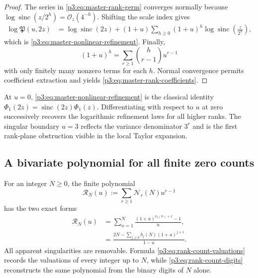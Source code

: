 \documentclass[11pt,oneside]{article}
\theoremstyle{definition}
\theoremstyle{remark}
\newcommand{\sinc}{\operatorname{sinc}}
\newcommand{\bigO}{\mathcal O}
\begin{document}
\begin{proof}
The series in \eqref{p3:eq:master-rank-germ} converges normally because
$\log\sinc(z/2^h)=\bigO_z(4^{-h})$.  Shifting the scale index gives
\begin{align*}
 \log\mathfrak P(u,2z)
 &=\log\sinc(2z)
 +(1+u)\sum_{h\ge0}(1+u)^h
   \log\sinc\!\left(\frac z{2^h}\right),
\end{align*}
which is \eqref{p3:eq:master-nonlinear-refinement}.  Finally,
\[
 (1+u)^h=\sum_{r\ge1}\binom h{r-1}u^{r-1}
\]
with only finitely many nonzero terms for each $h$.  Normal convergence permits coefficient extraction and yields \eqref{p3:eq:master-rank-coefficients}.
\end{proof}

\begin{remark}
At $u=0$, \eqref{p3:eq:master-nonlinear-refinement} is the classical identity
$\Phi_1(2z)=\sinc(2z)\Phi_1(z)$.  Differentiating with respect to $u$ at zero successively recovers the logarithmic refinement laws for all higher ranks.  The singular boundary $u=3$ reflects the variance denominator $3^r$ and is the first rank-plane obstruction visible in the local Taylor expansion.
\end{remark}

\subsection{A bivariate polynomial for all finite zero counts}

\begin{proposition}\label{p3:prop:rank-count-polynomial}
For an integer $N\ge0$, the finite polynomial
\begin{equation}\label{p3:eq:rank-count-poly-def}
 \mathscr R_N(u):=\sum_{r\ge1}\mathcal N_r(N)u^{r-1}
\end{equation}
has the two exact forms
\begin{align}
 \mathscr R_N(u)
 &=\sum_{n=1}^{N}
   \frac{(1+u)^{\nu_2(n)+1}-1}{u},\label{p3:eq:rank-count-valuations}\\
 &=\frac{2N-\displaystyle\sum_{j\ge0}b_j(N)(1+u)^{j+1}}
 {1-u}.\label{p3:eq:rank-count-digits}
\end{align}
All apparent singularities are removable.  Formula \eqref{p3:eq:rank-count-valuations} records the valuations of every integer up to $N$, while \eqref{p3:eq:rank-count-digits} reconstructs the same polynomial from the binary digits of $N$ alone.
\end{proposition}
\end{document}
